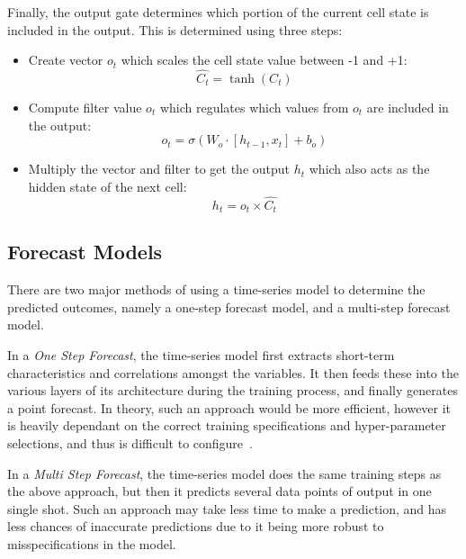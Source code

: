 Finally, the output gate determines which portion of the current cell state is included in the output. This is determined using three steps:
\begin{itemize}
    \item Create vector $o_{t}$ which scales the cell state value between -1 and +1:
    \begin{equation}
        \hat{C_{t}} = \tanh(C_{t})
    \end{equation}
    \item Compute filter value $o_{t}$ which regulates which values from $o_{t}$ are included in the output:
    \begin{equation}
        o_{t} = \sigma( W_{o}\cdot[h_{t-1}, x_{t}] + b_{o})
    \end{equation}
    \item Multiply the vector and filter to get the output $h_{t}$ which also acts as the hidden state of the next cell:
    \begin{equation}
        h_{t} = o_{t} \times \hat{C_{t}}
    \end{equation}
\end{itemize}

\subsection{Forecast Models}
\label{subsec:ch2-time-series-forecast-models}

There are two major methods of using a time-series model to determine the predicted outcomes, namely a one-step forecast model, and a multi-step forecast model.\par

In a \textit{One Step Forecast}, the time-series model first extracts short-term characteristics and correlations amongst the variables. It then feeds these into the various layers of its architecture during the training process, and finally generates a point forecast. In theory, such an approach would be more efficient, however it is heavily dependant on the correct training specifications and hyper-parameter selections, and thus is difficult to configure~\cite{marcellino2006comparison}.\par

In a \textit{Multi Step Forecast}, the time-series model does the same training steps as the above approach, but then it predicts several data points of output in one single shot. Such an approach may take less time to make a prediction, and has less chances of inaccurate predictions due to it being more robust to misspecifications in the model.
